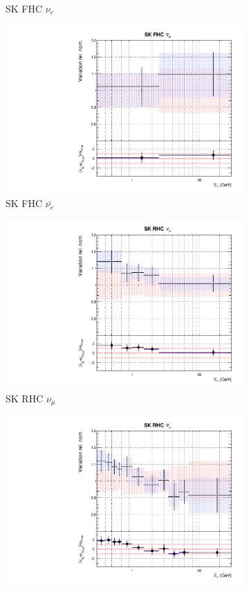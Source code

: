\begin{figure}[!htbp]
\begin{subfigure}{0.45\textwidth}
  \caption{SK FHC $\nu_{e}$}
\end{subfigure}
\begin{subfigure}{0.45\textwidth}
  \centering
  \includegraphics[width=0.75\linewidth]{figs/jointflux11}
  \caption{SK FHC $\bar{\nu_{e}}$}
\end{subfigure}
\begin{subfigure}{0.45\textwidth}
  \centering
  \includegraphics[width=0.75\linewidth]{figs/jointflux12}
  \caption{SK RHC $\nu_{\mu}$}
\end{subfigure}
\begin{subfigure}{0.45\textwidth}
  \centering
  \includegraphics[width=0.75\linewidth]{figs/jointflux13}

\end{subfigure}
\end{figure}
